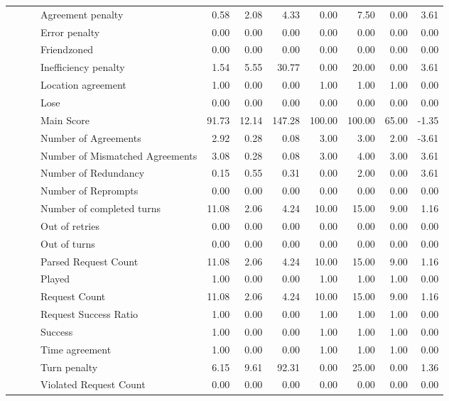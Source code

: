 \begin{tabular}{llllrrrrrrr}
 &  &  & Agreement penalty & 0.58 & 2.08 & 4.33 & 0.00 & 7.50 & 0.00 & 3.61 \\
 &  &  & Error penalty & 0.00 & 0.00 & 0.00 & 0.00 & 0.00 & 0.00 & 0.00 \\
 &  &  & Friendzoned & 0.00 & 0.00 & 0.00 & 0.00 & 0.00 & 0.00 & 0.00 \\
 &  &  & Inefficiency penalty & 1.54 & 5.55 & 30.77 & 0.00 & 20.00 & 0.00 & 3.61 \\
 &  &  & Location agreement & 1.00 & 0.00 & 0.00 & 1.00 & 1.00 & 1.00 & 0.00 \\
 &  &  & Lose & 0.00 & 0.00 & 0.00 & 0.00 & 0.00 & 0.00 & 0.00 \\
 &  &  & Main Score & 91.73 & 12.14 & 147.28 & 100.00 & 100.00 & 65.00 & -1.35 \\
 &  &  & Number of Agreements & 2.92 & 0.28 & 0.08 & 3.00 & 3.00 & 2.00 & -3.61 \\
 &  &  & Number of Mismatched Agreements & 3.08 & 0.28 & 0.08 & 3.00 & 4.00 & 3.00 & 3.61 \\
 &  &  & Number of Redundancy & 0.15 & 0.55 & 0.31 & 0.00 & 2.00 & 0.00 & 3.61 \\
 &  &  & Number of Reprompts & 0.00 & 0.00 & 0.00 & 0.00 & 0.00 & 0.00 & 0.00 \\
 &  &  & Number of completed turns & 11.08 & 2.06 & 4.24 & 10.00 & 15.00 & 9.00 & 1.16 \\
 &  &  & Out of retries & 0.00 & 0.00 & 0.00 & 0.00 & 0.00 & 0.00 & 0.00 \\
 &  &  & Out of turns & 0.00 & 0.00 & 0.00 & 0.00 & 0.00 & 0.00 & 0.00 \\
 &  &  & Parsed Request Count & 11.08 & 2.06 & 4.24 & 10.00 & 15.00 & 9.00 & 1.16 \\
 &  &  & Played & 1.00 & 0.00 & 0.00 & 1.00 & 1.00 & 1.00 & 0.00 \\
 &  &  & Request Count & 11.08 & 2.06 & 4.24 & 10.00 & 15.00 & 9.00 & 1.16 \\
 &  &  & Request Success Ratio & 1.00 & 0.00 & 0.00 & 1.00 & 1.00 & 1.00 & 0.00 \\
 &  &  & Success & 1.00 & 0.00 & 0.00 & 1.00 & 1.00 & 1.00 & 0.00 \\
 &  &  & Time agreement & 1.00 & 0.00 & 0.00 & 1.00 & 1.00 & 1.00 & 0.00 \\
 &  &  & Turn penalty & 6.15 & 9.61 & 92.31 & 0.00 & 25.00 & 0.00 & 1.36 \\
 &  &  & Violated Request Count & 0.00 & 0.00 & 0.00 & 0.00 & 0.00 & 0.00 & 0.00 \\

\end{tabular}
